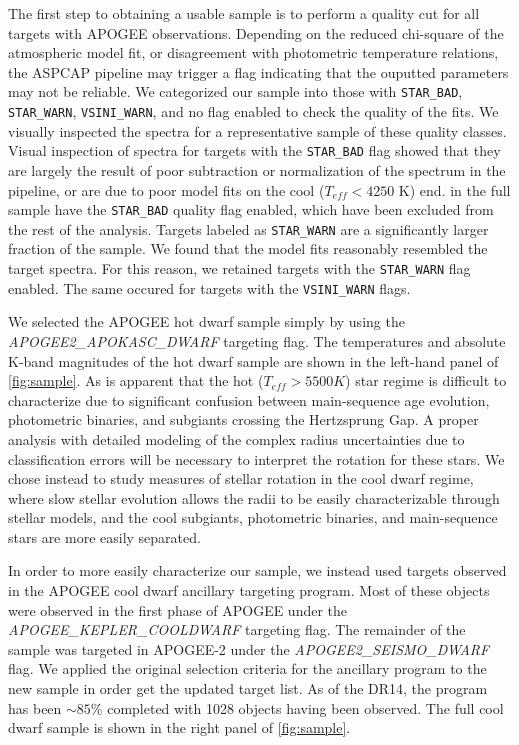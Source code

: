 \documentclass[manuscript]{aastex6}
\newcommand{\Teff}{\ensuremath{T_{eff}}}
\newcommand{\STARBAD}{\texttt{STAR\_BAD}}
\newcommand{\STARWARN}{\texttt{STAR\_WARN}}
\newcommand{\VSINIWARN}{\texttt{VSINI\_WARN}}
\newcommand{\gvs}{\authorcomment1}
\begin{document}
The first step to obtaining a usable sample is to perform a 
quality cut for all targets with APOGEE observations.
Depending on the reduced chi-square of the atmospheric model fit, or
disagreement with photometric temperature relations, the ASPCAP pipeline
may trigger a flag indicating that the ouputted parameters may not be
reliable. We categorized our sample into those with \STARBAD, \STARWARN,
\VSINIWARN{}, and no flag enabled to check the quality of the fits. We
visually inspected the spectra for a representative sample of these
quality classes. 
Visual inspection of spectra for targets with the \STARBAD{} flag showed that they are 
largely the result of poor subtraction or normalization of the spectrum in the
pipeline, or are due to poor model fits on the cool (\(\Teff < 4250\) K) end. 
\gvs{Calculate percentage} in the full sample have the \STARBAD{} quality 
flag enabled, which have been excluded from the rest of the analysis. 
Targets labeled as \STARWARN{} are a significantly larger fraction of the 
sample. We found that the model fits reasonably resembled the target spectra. 
For this reason, we retained targets with the \STARWARN{} flag enabled. The 
same occured for targets with the \VSINIWARN{} flags.

We selected the APOGEE hot dwarf sample simply by using the
\textit{APOGEE2\_APOKASC\_DWARF} targeting flag. The temperatures and 
absolute K-band magnitudes of the hot dwarf sample are shown in the left-hand panel of 
\cref{fig:sample}.  As is apparent that the hot 
(\(\Teff > 5500 K\)) star regime is difficult to characterize due to 
significant confusion between main-sequence age evolution,
photometric binaries, and subgiants crossing the Hertzsprung Gap.
A proper analysis with detailed modeling of the complex radius uncertainties 
due to classification errors will be necessary to interpret the rotation
for these stars. We chose instead to study measures of
stellar rotation in the cool dwarf regime, where
slow stellar evolution allows the radii to be easily characterizable through
stellar models, and the cool subgiants, photometric binaries, and main-sequence
stars are more easily separated.

In order to more easily characterize our sample, we instead used targets
observed in the APOGEE cool
dwarf ancillary targeting program.  Most of these objects were observed in 
the first phase of APOGEE under the
\textit{APOGEE\_KEPLER\_COOLDWARF} targeting flag. The remainder of
the sample was targeted in APOGEE-2 under the \textit{APOGEE2\_SEISMO\_DWARF}
flag. We applied the original selection criteria for the ancillary
program to the new sample in order get
the updated target list. As of the DR14, the program has been \(\sim 85\)\% 
completed with 1028 objects having been observed. The full cool dwarf sample is
shown in the right panel of \cref{fig:sample}.
\end{document}
